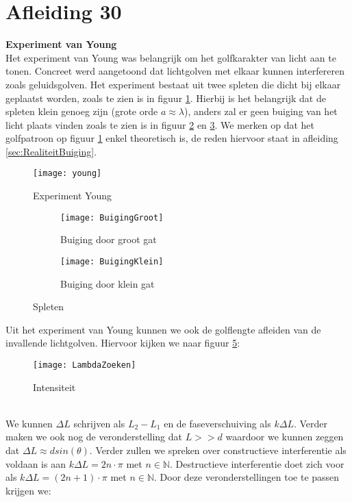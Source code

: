 \documentclass[a4paper,kul]{kulakarticle} %
\begin{document}
\newpage
\section{Afleiding 30}
\label{sec:young}
\textbf{Experiment van Young}\\
Het experiment van Young was belangrijk om het golfkarakter van licht aan te tonen. Concreet werd aangetoond dat lichtgolven met elkaar kunnen interfereren zoals geluidsgolven. Het experiment bestaat uit twee spleten die dicht bij elkaar geplaatst worden, zoals te zien is in figuur \ref{fig:young}. Hierbij is het belangrijk dat de spleten klein genoeg zijn (grote orde $a\approx\lambda$), anders zal er geen buiging van het licht plaats vinden zoals te zien is in figuur \ref{fig:buiginggroot} en \ref{fig:buigingklein}. We merken op dat het golfpatroon op figuur \ref{fig:young} enkel theoretisch is, de reden hiervoor staat in afleiding \ref{sec:RealiteitBuiging}.
\begin{figure}[!h]
	\centering
	\texttt{[image: young]}
	\caption[Experiment Young]{Experiment Young}
	\label{fig:young}
\end{figure}
\begin{figure}[!h]
	\centering
	\begin{subfigure}{.5\textwidth}
		\centering
		\texttt{[image: BuigingGroot]}
		\caption[Buiging grote doorlating]{Buiging door groot gat}
		\label{fig:buiginggroot}
	\end{subfigure}%
	\begin{subfigure}{.5\textwidth}
		\centering
		\texttt{[image: BuigingKlein]}
		\caption[Buiging kleine doorlating]{Buiging door klein gat}
		\label{fig:buigingklein}
	\end{subfigure}
	\caption{Spleten}
	\label{fig:Spleten}
\end{figure}
\newpage
Uit het experiment van Young kunnen we ook de golflengte afleiden van de invallende lichtgolven. Hiervoor kijken we naar figuur \ref{fig:lambdazoeken}:
\begin{figure}[!h]
	\centering
	\texttt{[image: LambdaZoeken]}
	\caption[Berekening intensiteit]{Intensiteit}
	\label{fig:lambdazoeken}
\end{figure}\\
We kunnen $\Delta L$ schrijven als $L_2-L_1$ en de faseverschuiving als $k\Delta L$. Verder maken we ook nog de veronderstelling dat $L>>d$ waardoor we kunnen zeggen dat $\Delta L \approx dsin(\theta)$. Verder zullen we spreken over constructieve interferentie als voldaan is aan $k\Delta L = 2n\cdot\pi$ met $n\in\mathbb{N}$. Destructieve interferentie doet zich voor als $k\Delta L = (2n+1)\cdot\pi$ met $n\in\mathbb{N}$. Door deze veronderstellingen toe te passen krijgen we:
\end{document}
